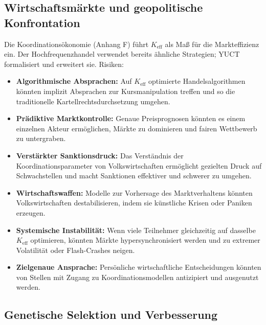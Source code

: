 \documentclass[12pt,a4paper]{article}
\theoremstyle{remark}
\newcommand{\Keff}{K_{\mathrm{eff}}}
\begin{document}
	\subsection{Wirtschaftsmärkte und geopolitische Konfrontation}
	\label{subsec:econ}
	
	Die Koordinationsökonomie (Anhang F) führt \(\Keff\) als Maß für die Markteffizienz ein. Der Hochfrequenzhandel verwendet bereits ähnliche Strategien; YUCT formalisiert und erweitert sie. Risiken:
	\begin{itemize}[leftmargin=*]
		\item \textbf{Algorithmische Absprachen:} Auf \(\Keff\) optimierte Handelsalgorithmen könnten implizit Absprachen zur Kursmanipulation treffen und so die traditionelle Kartellrechtsdurchsetzung umgehen.
		\item \textbf{Prädiktive Marktkontrolle:} Genaue Preisprognosen könnten es einem einzelnen Akteur ermöglichen, Märkte zu dominieren und fairen Wettbewerb zu untergraben.
		\item \textbf{Verstärkter Sanktionsdruck:} Das Verständnis der Koordinationsparameter von Volkswirtschaften ermöglicht gezielten Druck auf Schwachstellen und macht Sanktionen effektiver und schwerer zu umgehen.
		\item \textbf{Wirtschaftswaffen:} Modelle zur Vorhersage des Marktverhaltens könnten Volkswirtschaften destabilisieren, indem sie künstliche Krisen oder Paniken erzeugen.
		\item \textbf{Systemische Instabilität:} Wenn viele Teilnehmer gleichzeitig auf dasselbe \(\Keff\) optimieren, könnten Märkte hypersynchronisiert werden und zu extremer Volatilität oder Flash-Crashes neigen.
		\item \textbf{Zielgenaue Ansprache:} Persönliche wirtschaftliche Entscheidungen könnten von Stellen mit Zugang zu Koordinationsmodellen antizipiert und ausgenutzt werden.
	\end{itemize}
	
	\subsection{Genetische Selektion und Verbesserung}
	\label{subsec:genetic}
	
\end{document}
